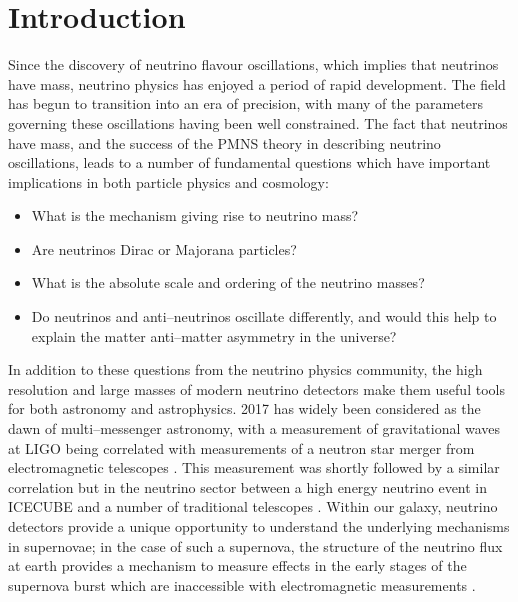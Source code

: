 \chapter{\label{ch:intro}Introduction} 


Since the discovery of neutrino flavour oscillations, which implies that
neutrinos have mass, neutrino physics has enjoyed a period of rapid development.
The field has begun to transition into an era of precision, with many of the
parameters governing these oscillations having been well constrained. The fact
that neutrinos have mass, and the success of the PMNS theory in describing
neutrino oscillations, leads to a number of fundamental questions which have
important implications in both particle physics and cosmology: 

\begin{itemize}
	\item What is the mechanism giving rise to neutrino mass? 
	\item Are neutrinos Dirac or Majorana particles?
	\item What is the absolute scale and ordering of the neutrino masses?
	\item Do neutrinos and anti--neutrinos oscillate differently, and would this 
	      help to explain the matter anti--matter asymmetry in the universe?
\end{itemize}

In addition to these questions from the neutrino physics community, the high
resolution and large masses of modern neutrino detectors make them useful tools
for both astronomy and astrophysics. 2017 has widely been considered as the dawn
of multi--messenger astronomy, with a measurement of gravitational waves at LIGO
being correlated with measurements of a neutron star merger from electromagnetic
telescopes \cite{Abbott2017}. This measurement was shortly followed by a similar
correlation but in the neutrino sector between a high energy neutrino event in
ICECUBE and a number of traditional telescopes \cite{Aartsen2018}. Within our
galaxy, neutrino detectors provide a unique opportunity to understand the
underlying mechanisms in supernovae; in the case of such a supernova, the
structure of the neutrino flux at earth provides a mechanism to measure effects
in the early stages of the supernova burst which are inaccessible with
electromagnetic measurements \cite{Scholberg:2012id}.

